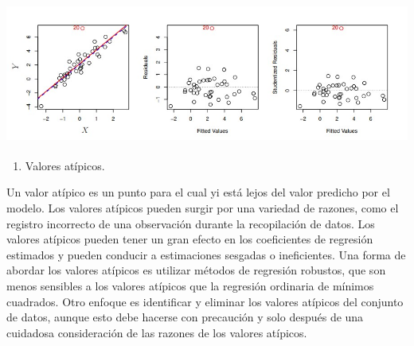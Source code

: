 \documentclass[
  letterpaper,
  DIV=11,
  numbers=noendperiod]{scrartcl}
\let\oldparagraph\paragraph
\renewcommand{\paragraph}[1]{\oldparagraph{#1}\mbox{}}
\providecommand{\tightlist}{%
  \setlength{\itemsep}{0pt}\setlength{\parskip}{0pt}}\usepackage{longtable,booktabs,array}
\begin{document}
\hypertarget{figura-12.-izquierda-la-luxednea-de-regresiuxf3n-de-muxednimos-cuadrados-se-muestra-en-rojo-y-la-la-luxednea-de-regresiuxf3n-despuuxe9s-de-eliminar-el-valor-atuxedpico-se-muestra-en-azul.-centro-el-residual-la-trama-identifica-claramente-el-valor-atuxedpico.-derecha-el-valor-atuxedpico-tiene-un-residuo-estudentizado-de-6-tuxedpicamente-esperamos-valores-entre-3-y-3.}{%
\paragraph{\texorpdfstring{\protect\includegraphics{images/sdas.jpg}}{FIGURA 12. Izquierda: La línea de regresión de mínimos cuadrados se muestra en rojo, y la la línea de regresión después de eliminar el valor atípico se muestra en azul. Centro: El residual la trama identifica claramente el valor atípico. Derecha: El valor atípico tiene un residuo estudentizado de 6; típicamente esperamos valores entre −3 y 3.}}\label{figura-12.-izquierda-la-luxednea-de-regresiuxf3n-de-muxednimos-cuadrados-se-muestra-en-rojo-y-la-la-luxednea-de-regresiuxf3n-despuuxe9s-de-eliminar-el-valor-atuxedpico-se-muestra-en-azul.-centro-el-residual-la-trama-identifica-claramente-el-valor-atuxedpico.-derecha-el-valor-atuxedpico-tiene-un-residuo-estudentizado-de-6-tuxedpicamente-esperamos-valores-entre-3-y-3.}}

\begin{enumerate}
\def\labelenumi{\arabic{enumi}.}
\setcounter{enumi}{3}
\tightlist
\item
  Valores atípicos.
\end{enumerate}

Un valor atípico es un punto para el cual yi está lejos del valor
predicho por el modelo. Los valores atípicos pueden surgir por una
variedad de razones, como el registro incorrecto de una observación
durante la recopilación de datos. Los valores atípicos pueden tener un
gran efecto en los coeficientes de regresión estimados y pueden conducir
a estimaciones sesgadas o ineficientes. Una forma de abordar los valores
atípicos es utilizar métodos de regresión robustos, que son menos
sensibles a los valores atípicos que la regresión ordinaria de mínimos
cuadrados. Otro enfoque es identificar y eliminar los valores atípicos
del conjunto de datos, aunque esto debe hacerse con precaución y solo
después de una cuidadosa consideración de las razones de los valores
atípicos.
\end{document}
